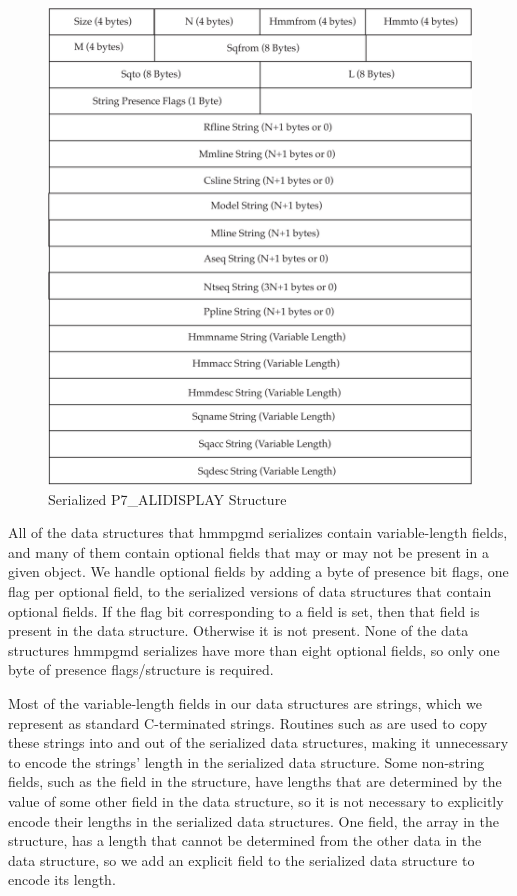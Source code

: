 \documentclass[notoc,justified]{tufte-book}    %
\begin{document}
\begin{figure}
\includegraphics[width=\textwidth]{inclusions/alidisplay-serialize.pdf}
\caption{Serialized {P7\_ALIDISPLAY} Structure}
\label{fig:alidisplay-serialize}
\end{figure}

All of the data structures that hmmpgmd serializes contain variable-length fields, and many of them contain optional fields that may or may not be present in a given object.  We handle optional fields by adding a byte of presence bit flags, one flag per optional field, to the serialized versions of data structures that contain optional fields.  If the flag bit corresponding to a field is set, then that field is present in the data structure. Otherwise it is not present.  None of the data structures hmmpgmd serializes have more than eight optional fields, so only one byte of presence flags/structure is required.

Most of the variable-length fields in our data structures are strings, which we represent as standard C-terminated strings.  Routines such as  are used to copy these strings into and out of the serialized data structures, making it unnecessary to encode the strings' length in the serialized data structure.  Some non-string fields, such as the  field in the {} structure, have lengths that are determined by the value of some other field in the data structure, so it is not necessary to explicitly encode their lengths in the serialized data structures. One field, the  array in the {} structure, has a length that cannot be determined from the other data in the data structure, so we add an explicit field to the serialized data structure to encode its length.
\end{document}
